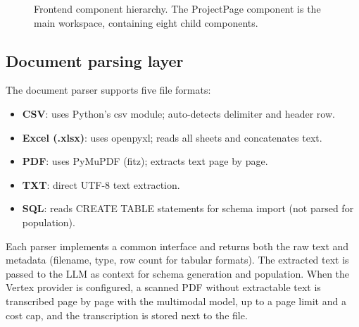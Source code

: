 \documentclass[11pt,a4paper]{article}
\begin{document}
\begin{figure}[htbp]
\centering
{}
\caption{Frontend component hierarchy. The ProjectPage component is the main workspace, containing eight child components.}
\label{fig:component-tree}
\end{figure}

\subsection{Document parsing layer}
The document parser supports five file formats:
\begin{itemize}
  \item \textbf{CSV}: uses Python's csv module; auto-detects delimiter and header row.
  \item \textbf{Excel (.xlsx)}: uses openpyxl; reads all sheets and concatenates text.
  \item \textbf{PDF}: uses PyMuPDF (fitz); extracts text page by page.
  \item \textbf{TXT}: direct UTF-8 text extraction.
  \item \textbf{SQL}: reads CREATE TABLE statements for schema import (not parsed for population).
\end{itemize}
Each parser implements a common interface and returns both the raw text and metadata (filename, type, row count for tabular formats). The extracted text is passed to the LLM as context for schema generation and population. When the Vertex provider is configured, a scanned PDF without extractable text is transcribed page by page with the multimodal model, up to a page limit and a cost cap, and the transcription is stored next to the file.
\end{document}
